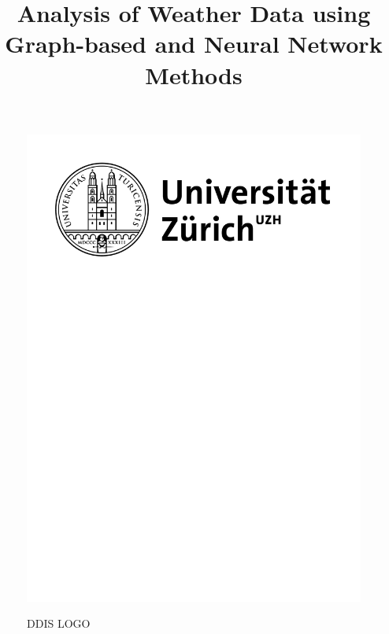 \documentclass[a4paper, twoside, openright]{report}
\title{Analysis of Weather Data using Graph-based and Neural Network Methods}
\begin{document}
\begin{titlepage}
\begingroup
\centering
\vspace*{\baselineskip}

\thispagestyle{empty}

\begin{figure}[H]
	\centering
	\begin{minipage}{.49\textwidth}
		\centering
		\includegraphics[scale=0.2]{img/UZH.png}
	\end{minipage}
	\begin{minipage}{.49\textwidth}
		\centering
		DDIS LOGO
	\end{minipage}
\end{figure}

\vspace*{1\baselineskip}


\end{titlepage}
\end{document}
